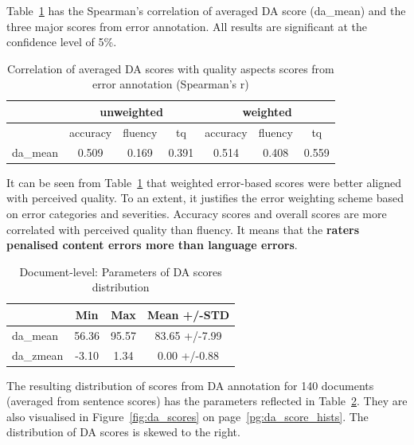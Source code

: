 Table~\ref{tab:doc_err-da_corr} has the Spearman's correlation of averaged DA score (da\_mean) and the three major scores from error annotation. All results are significant at the confidence level of 5\%.

\begin{table}[H]
	\centering
	\begin{tabular}{l|ccc|ccc}
		\toprule
				& \multicolumn{3}{c|}{unweighted} & \multicolumn{3}{c}{weighted} \\
		\midrule
		& accuracy   & fluency & tq    & accuracy & fluency & tq    \\
		\midrule
		da\_mean & 0.509      & 0.169   & 0.391 & 0.514    & 0.408   & 0.559 \\
		\bottomrule
	\end{tabular}
\caption{\label{tab:doc_err-da_corr}Correlation of averaged DA scores with quality aspects scores from error annotation (Spearman's r)}
\end{table}

It can be seen from Table~\ref{tab:doc_err-da_corr} that weighted error-based scores were better aligned with perceived quality. To an extent, it justifies the error weighting scheme based on error categories and severities. Accuracy scores and overall scores are more correlated with perceived quality than fluency. It means that the \textbf{raters penalised content errors more than language errors}. 

\begin{table}[H]
	\centering
	\begin{tabular}{l|ccc}
		\toprule
		& Min   & Max    & Mean +/-\gls{STD}          \\
		\midrule
		da\_mean  & 56.36 & 95.57 & 83.65 +/-7.99 \\
		da\_zmean & -3.10 & 1.34  & 0.00 +/-0.88 \\
		\bottomrule
	\end{tabular}
	\caption{\label{tab:doc_da_dist}Document-level: Parameters of DA scores distribution}
\end{table}

The resulting distribution of scores from DA annotation for 140 documents (averaged from sentence scores) has the parameters reflected in Table~\ref{tab:doc_da_dist}. They are also visualised in Figure~\ref{fig:da_scores} on page~\ref{pg:da_score_hists}. The distribution of DA scores is skewed to the right. 

